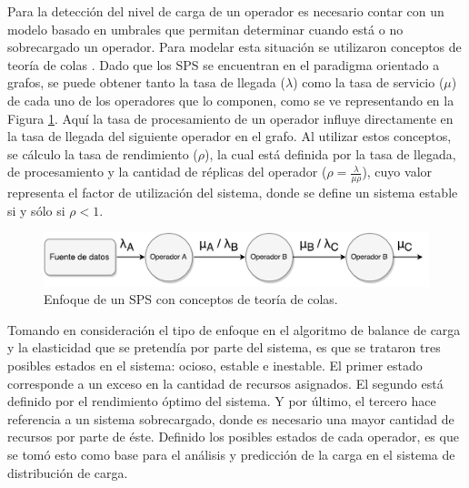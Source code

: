 
Para la detección del nivel de carga de un operador es necesario contar con un modelo basado en umbrales que permitan determinar cuando está o no sobrecargado un operador. Para modelar esta situación se utilizaron conceptos de teoría de colas \citep{bose2013introduction}. Dado que los SPS se encuentran en el paradigma orientado a grafos, se puede obtener tanto la tasa de llegada ($\lambda$) como la tasa de servicio ($\mu$) de cada uno de los operadores que lo componen, como se ve representando en la Figura \ref{fig:analisisTeoriaColas}. Aquí la tasa de procesamiento de un operador influye directamente en la tasa de llegada del siguiente operador en el grafo. Al utilizar estos conceptos, se cálculo la tasa de rendimiento ($\rho$), la cual está definida por la tasa de llegada, de procesamiento y la cantidad de réplicas del operador ($\rho = \frac{\lambda}{\mu \rho}$), cuyo valor representa el factor de utilización del sistema, donde se define un sistema estable si y sólo si $\rho < 1$.

\begin{figure}[!hb]
	\centering
		\includegraphics[scale=0.6]{images/AnalisisTeoriaColas.pdf}
	\caption{Enfoque de un SPS con conceptos de teoría de colas.}
	\label{fig:analisisTeoriaColas}
\end{figure}

Tomando en consideración el tipo de enfoque en el algoritmo de balance de carga y la elasticidad que se pretendía por parte del sistema, es que se trataron tres posibles estados en el sistema: ocioso, estable e inestable. El primer estado corresponde a un exceso en la cantidad de recursos asignados. El segundo está definido por el rendimiento óptimo del sistema. Y por último, el tercero hace referencia a un sistema sobrecargado, donde es necesario una mayor cantidad de recursos por parte de éste. Definido los posibles estados de cada operador, es que se tomó esto como base para el análisis y predicción de la carga en el sistema de distribución de carga.

